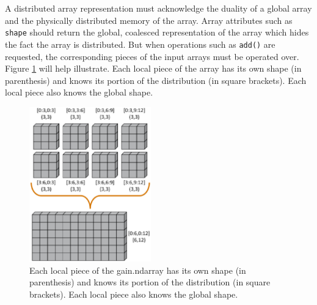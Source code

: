 \documentclass{sigplanconf}
\begin{document}
A distributed array representation must acknowledge the duality of a global
array and the physically distributed memory of the array. Array attributes
such as \verb=shape= should return the global, coalesced representation of the
array which hides the fact the array is distributed. But when operations such
as \verb=add()= are requested, the corresponding pieces of the input arrays
must be operated over. Figure \ref{fig:1} will help illustrate.  Each local
piece of the array has its own shape (in parenthesis) and knows its portion of
the distribution (in square brackets). Each local piece also knows the global
shape.

\begin{figure}[htb]
\centering
\includegraphics[width=0.47\textwidth]{image1_crop.eps}
\caption{
Each local piece of the gain.ndarray has its own shape (in parenthesis)
and knows its portion of the distribution (in square brackets).  Each local
piece also knows the global shape.
}
\label{fig:1}
\end{figure}
\end{document}
